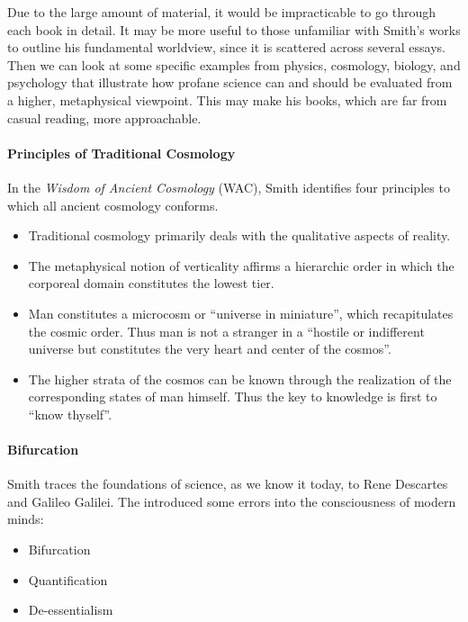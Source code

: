 Due to the large amount of material, it would be impracticable to go through each book in detail. It may be more useful to those unfamiliar with Smith's works to outline his fundamental worldview, since it is scattered across several essays. Then we can look at some specific examples from physics, cosmology, biology, and psychology that illustrate how profane science can and should be evaluated from a higher, metaphysical viewpoint. This may make his books, which are far from casual reading, more approachable.

\paragraph{Principles of Traditional Cosmology}


In the \emph{Wisdom of Ancient Cosmology} (WAC), Smith identifies four principles to which all ancient cosmology conforms.

\begin{itemize}


\item Traditional cosmology primarily deals with the qualitative aspects of reality.

\item The metaphysical notion of verticality affirms a hierarchic order in which the corporeal domain constitutes the lowest tier.

\item Man constitutes a microcosm or ``universe in miniature'', which recapitulates the cosmic order. Thus man is not a stranger in a ``hostile or indifferent universe but constitutes the very heart and center of the cosmos''.

\item The higher strata of the cosmos can be known through the realization of the corresponding states of man himself. Thus the key to knowledge is first to ``know thyself''.
\end{itemize}


\paragraph{Bifurcation}


Smith traces the foundations of science, as we know it today, to Rene Descartes and Galileo Galilei. The introduced some errors into the consciousness of modern minds:

\begin{itemize}


\item Bifurcation

\item Quantification

\item De-essentialism
\end{itemize}


